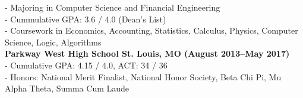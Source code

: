 \documentclass[12pt]{article}
\begin{document}
\begin{titlepage}
\begin{addmargin}[1em]{0em}
- Majoring in Computer Science and Financial Engineering\\
- Cummulative GPA: 3.6 / 4.0 (Dean's List)\\
- Coursework in Economics, Accounting, Statistics, Calculus, Physics, Computer Science, Logic, Algorithms\\
			\textbf{Parkway West High School St. Louis, MO \hfill (August 2013–May 2017)}\\
- Cumulative GPA: 4.15 / 4.0, ACT: 34 / 36\\
- Honors: National Merit Finalist, National Honor Society, Beta Chi Pi, Mu Alpha Theta, Summa Cum Laude \\
		\end{addmargin}
	\end{titlepage}
\end{document}
